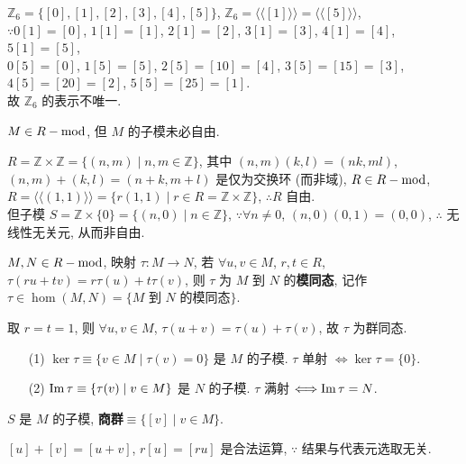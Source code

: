 \documentclass{note}
\begin{document}
\begin{eg}
    $\mathbb{Z}_6=\{[0],[1],[2],[3],[4],[5]\}$, $\mathbb{Z}_6=\langle\langle[1]\rangle\rangle=\langle\langle[5]\rangle\rangle$,\\
    $\because 0[1]=[0]$, $1[1]=[1]$, $2[1]=[2]$, $3[1]=[3]$, $4[1]=[4]$, $5[1]=[5]$,\\
    $0[5]=[0]$, $1[5]=[5]$, $2[5]=[10]=[4]$, $3[5]=[15]=[3]$, $4[5]=[20]=[2]$, $5[5]=[25]=[1]$.\\
    故 $\mathbb{Z}_6$ 的表示不唯一.
\end{eg}

$M\in R-\operatorname{mod}$, 但 $M$ 的子模未必自由.
\begin{eg}
    $R=\mathbb{Z}\times\mathbb{Z}=\{(n,m)\mid n,m\in\mathbb{Z}\}$, 其中 $(n,m)(k,l)=(nk,ml)$, $(n,m)+(k,l)=(n+k,m+l)$ 是仅为交换环 (而非域), $R\in R-\operatorname{mod}$, $R=\langle\langle(1,1)\rangle\rangle=\{r(1,1)\mid r\in R=\mathbb{Z}\times\mathbb{Z}\}$, $\therefore R$ 自由.\\
    但子模 $S=\mathbb{Z}\times\{0\}=\{(n,0)\mid n\in\mathbb{Z}\}$, $\because\forall n\neq 0$, $(n,0)(0,1)=(0,0)$, $\therefore$ 无线性无关元, 从而非自由.
\end{eg}

\begin{df}[模同态]
    $M,N\in R-\operatorname{mod}$, 映射 $\tau:M\rightarrow N$, 若 $\forall u,v\in M$, $r,t\in R$, $\tau(ru+tv)=r\tau(u)+t\tau(v)$, 则 $\tau$ 为 $M$ 到 $N$ 的\textbf{模同态}, 记作 $\tau\in\hom(M,N)=\{\text{$M$ 到 $N$ 的模同态}\}$.
\end{df}

取 $r=t=1$, 则 $\forall u,v\in M$, $\tau(u+v)=\tau(u)+\tau(v)$, 故 $\tau$ 为群同态.

\begin{thm}[(课本定理 4.6)]
    \begin{itemize}
        \item[(1)] $\ker\tau\equiv\{v\in M\mid\tau(v)=0\}$ 是 $M$ 的子模. $\tau$ 单射 $\Longleftrightarrow\ker\tau=\{0\}$.
        \item[(2)] $\operatorname{Im}\tau\equiv\{\tau(v)\mid v\in M\}$ 是 $N$ 的子模. $\tau$ 满射 $\Longleftrightarrow\operatorname{Im}\tau=N$.
    \end{itemize}
\end{thm}

\begin{df}[商模]
    $S$ 是 $M$ 的子模, \textbf{商群}$\equiv\{[v]\mid v\in M\}$.
\end{df}

$[u]+[v]=[u+v]$, $r[u]=[ru]$ 是合法运算, $\because$ 结果与代表元选取无关.
\end{document}
